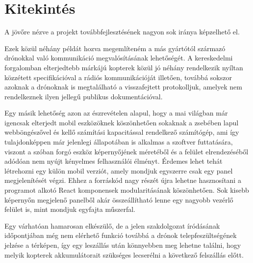 \section{Kitekintés}

A jövőre nézve a projekt továbbfejlesztésének nagyon sok iránya képzelhető el.

Ezek közül néhány példát hozva megemlíteném a más gyártótól származó drónokkal
való kommunikáció megvalósításának lehetőségét. A kereskedelmi forgalomban
elterjedtebb márkájú kopterek közül jó néhány rendelkezik nyíltan közzétett
specifikációval a rádiós kommunikációját illetően, továbbá sokszor azoknak a
drónoknak is megtalálható a visszafejtett protokolljuk, amelyek nem rendelkeznek
ilyen jellegű publikus dokumentációval.

Egy másik lehetőség azon az észrevételen alapul, hogy a mai világban már
igencsak elterjedt mobil eszközöknek köszönhetően sokaknak a zsebében lapul
webböngészővel és kellő számítási kapacitással rendelkező számítógép, ami így
tulajdonképpen már jelenlegi állapotában is alkalmas a szoftver futtatására,
viszont a szóban forgó eszköz képernyőjének méretéből és a felület
elrendezéséből adódóan nem nyújt kényelmes felhasználói élményt. Érdemes lehet
tehát létrehozni egy külön mobil verziót, amely mondjuk egyszerre csak egy panel
megjelenítését végzi. Ehhez a forráskód nagy részét újra lehetne hasznosítani a
programot alkotó React komponensek modularitásának köszönhetően. Sok kisebb
képernyőn megjelenő panelből akár összeállítható lenne egy nagyobb vezérlő
felület is, mint mondjuk egyfajta műszerfal.

Egy várhatóan hamarosan elkészülő, de a jelen szakdolgozat íródásának
időpontjában még nem elérhető funkció továbbá a drónok telepfeszültségének
jelzése a térképen, így egy leszállás után könnyebben meg lehetne találni, hogy
melyik kopterek akkumulátorait szükséges lecserélni a következő felszállás
előtt.
